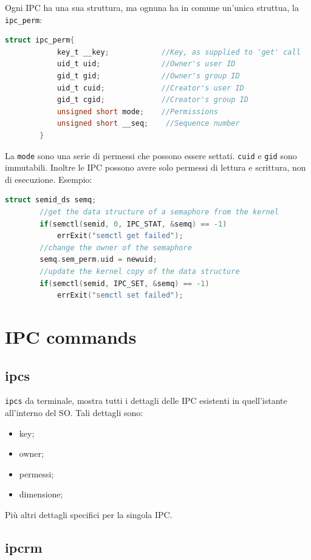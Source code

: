 \documentclass[a4paper, 12pt]{book}
\begin{document}
    Ogni IPC ha una sua struttura, ma ognuna ha in comune 
    un'unica struttua, la \verb|ipc_perm|:
    \begin{lstlisting}[language=C]
        struct ipc_perm{
            key_t __key;            //Key, as supplied to 'get' call
            uid_t uid;              //Owner's user ID
            gid_t gid;              //Owner's group ID
            uid_t cuid;             //Creator's user ID
            gid_t cgid;             //Creator's group ID
            unsigned short mode;    //Permissions
            unsigned short __seq;    //Sequence number
        }
    \end{lstlisting}
    La \verb|mode| sono una serie di permessi che possono 
    essere settati. \verb|cuid| e \verb|gid| sono immutabili.
    Inoltre le IPC possono avere solo permessi di lettura 
    e scrittura, non di esecuzione.
    Esempio:
    \begin{lstlisting}[language=C]
        struct semid_ds semq;
        //get the data structure of a semaphore from the kernel 
        if(semctl(semid, 0, IPC_STAT, &semq) == -1)
            errExit("semctl get failed");
        //change the owner of the semaphore
        semq.sem_perm.uid = newuid;
        //update the kernel copy of the data structure 
        if(semctl(semid, IPC_SET, &semq) == -1)
            errExit("semctl set failed");
    \end{lstlisting}
    
    \section{IPC commands}

    \subsection{ipcs}

    \verb|ipcs| da terminale, mostra tutti i dettagli 
    delle IPC esistenti in quell'istante all'interno del SO.
    Tali dettagli sono:
    \begin{itemize}
        \item key;
        \item owner;
        \item permessi;
        \item dimensione;
    \end{itemize}
    Più altri dettagli specifici per la singola IPC.
    
    \subsection{ipcrm}
\end{document}
